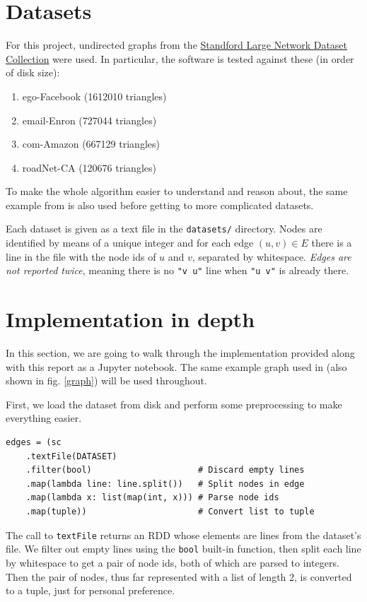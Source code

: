 \documentclass[paper=a4, fontsize=11pt]{scrartcl}
\begin{document}
\section{Datasets} \label{datasets}
For this project, undirected graphs from the
\href{http://snap.stanford.edu/data/index.html}{Standford Large Network Dataset
Collection} were used. In particular, the software is tested against these (in
order of disk size):
\begin{enumerate}
    \item ego-Facebook (1612010 triangles)
    \item email-Enron (727044 triangles)
    \item com-Amazon (667129 triangles)
    \item roadNet-CA (120676 triangles)
\end{enumerate}

To make the whole algorithm easier to understand and reason about, the same
example from \cite{park2013efficient} is also used before getting to more
complicated datasets.

Each dataset is given as a text file in the \texttt{datasets/}
directory. Nodes are identified by means of a unique integer and for each edge
$(u,v) \in E$ there is a line in the file with the node ids of $u$ and $v$,
separated by whitespace. \emph{Edges are not reported twice}, meaning there is
no \texttt{"v u"} line when \texttt{"u v"} is already there.

\section{Implementation in depth}
In this section, we are going to walk through the implementation provided along
with this report as a Jupyter notebook. The same example graph used in
\cite{park2013efficient} (also shown in fig. \ref{graph}) will be used
throughout.

First, we load the dataset from disk and perform some preprocessing to make
everything easier.
\begin{verbatim}
edges = (sc
    .textFile(DATASET)
    .filter(bool)                     # Discard empty lines
    .map(lambda line: line.split())   # Split nodes in edge
    .map(lambda x: list(map(int, x))) # Parse node ids
    .map(tuple))                      # Convert list to tuple
\end{verbatim}
The call to \texttt{textFile} returns an RDD whose elements are
lines from the dataset's file. We filter out empty lines using the
\texttt{bool} built-in function, then split each line by whitespace
to get a pair of node ids, both of which are parsed to integers. Then the pair
of nodes, thus far represented with a list of length 2, is converted to a tuple,
just for personal preference.
\end{document}
